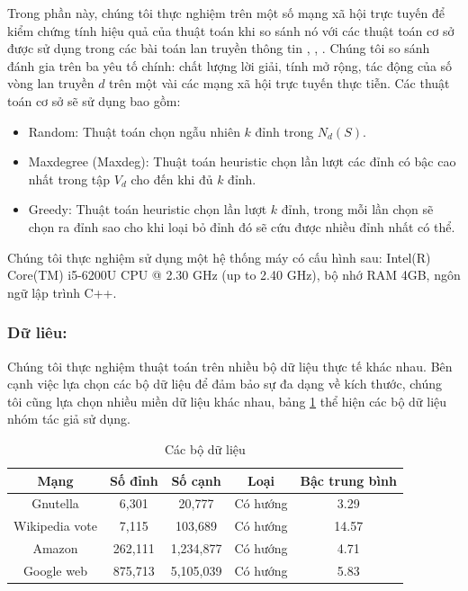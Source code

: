 Trong phần này, chúng tôi thực nghiệm trên một số mạng xã hội trực tuyến để kiểm chứng tính hiệu quả của thuật toán khi so sánh nó với các thuật toán cơ sở được sử dụng trong các bài toán lan truyền thông tin \cite{nguyen30}, \cite{kemple1}, \cite{zhang32}. Chúng tôi so sánh đánh gia trên ba yêu tố chính: chất lượng lời giải, tính mở rộng, tác động của số vòng lan truyền $d$ trên một vài các mạng xã hội trực tuyến thực tiễn. Các thuật toán cơ sở sẽ sử dụng bao gồm:
\begin{itemize}
\item Random: Thuật toán chọn ngẫu nhiên $k$ đỉnh trong $N_{d}(S)$.

\item Maxdegree (Maxdeg): Thuật toán heuristic chọn lần lượt các đỉnh có bậc cao nhất trong tập $V_{d}$ cho đến khi đủ $k$ đỉnh.

\item Greedy: Thuật toán heuristic chọn lần lượt $k$ đỉnh, trong mỗi lần chọn sẽ chọn ra đỉnh sao cho khi loại bỏ đỉnh đó sẽ cứu được nhiều đỉnh nhất có thể.
\end{itemize}

Chúng tôi thực nghiệm sử dụng một hệ thống máy có cấu hình sau: Intel(R) Core(TM) i5-6200U CPU @ 2.30 GHz (up to 2.40 GHz), bộ nhớ RAM 4GB, ngôn ngữ lập trình C++.

\subsubsection{Dữ liêu:}

Chúng tôi thực nghiệm thuật toán trên nhiều bộ dữ liệu thực tế khác nhau. Bên cạnh việc lựa chọn các bộ dữ liệu để đảm bảo sự đa dạng về kích thước, chúng tôi cũng lựa chọn nhiều miền dữ liệu khác nhau, bảng \ref{tab:Table1} thể hiện các bộ dữ liệu nhóm tác giả sử dụng.
\begin{table}
	\centering
	\begin{tabular}{|c|c|c|c|c|}
		\hline 
		Mạng & Số đỉnh & Số cạnh & Loại & Bậc trung bình \\ 
		\hline 
		Gnutella & 6,301 & 20,777 & Có hướng & 3.29 \\ 
		\hline 
		Wikipedia vote & 7,115 & 103,689 & Có hướng & 14.57 \\ 
		\hline 
		Amazon & 262,111 & 1,234,877 & Có hướng & 4.71 \\ 
		\hline 
		Google web & 875,713 & 5,105,039 & Có hướng & 5.83 \\ 
		\hline 
	\end{tabular} 
	\caption{Các bộ dữ liệu}
	\label{tab:Table1}
\end{table}


